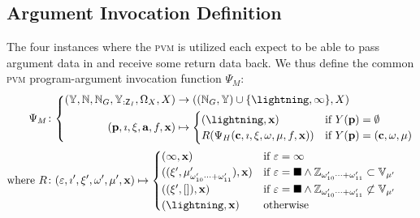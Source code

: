 \subsection{Argument Invocation Definition}

The four instances where the \textsc{pvm} is utilized each expect to be able to pass argument data in and receive some return data back. We thus define the common \textsc{pvm} program-argument invocation function $\Psi_M$:
\begin{align}
  \Psi_M&\colon \left\{\begin{aligned}
    (\Y, \N, \N_G, \Y_{:\mathsf{Z}_I}, \Omega_X, X) &\to ((\N_G, \Y) \cup \{\panic, \oog\}, X)\\
    (\mathbf{p}, \imath, \xi, \mathbf{a}, f, \mathbf{x}) &\mapsto \begin{cases}
      (\panic, \mathbf{x}) &\when Y(\mathbf{p}) = \none\\
      R(\Psi_H(\mathbf{c}, \imath, \xi, \omega, \mem, f, \mathbf{x})) &\when Y(\mathbf{p}) = (\mathbf{c}, \omega, \mem)
    \end{cases}
  \end{aligned}\right.\\
  \where R&\colon (\varepsilon, \imath', \xi', \omega', \mem', \mathbf{x}) \mapsto \begin{cases}
    (\oog, \mathbf{x}) &\when \varepsilon = \oog \\
    ((\xi', \mu'_{\omega'_{10}\dots+\omega'_{11}}), \mathbf{x}) &\when \varepsilon = \halt \wedge \mathbb{Z}_{\omega'_{10}\dots+\omega'_{11}} \subset \mathbb{V}_{\mem'} \\
    ((\xi', []), \mathbf{x}) &\when \varepsilon = \halt \wedge \mathbb{Z}_{\omega'_{10}\dots+\omega'_{11}} \not\subset \mathbb{V}_{\mem'} \\
    (\panic, \mathbf{x}) &\otherwise \\
  \end{cases}
\end{align}
